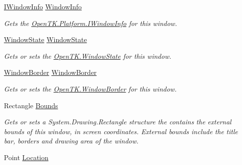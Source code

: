 \begin{DoxyCompactItemize}
\hyperlink{interface_open_t_k_1_1_platform_1_1_i_window_info}{I\-Window\-Info} \hyperlink{interface_open_t_k_1_1_i_native_window_a3e00033ca7bda60905c346fc2335e1b8}{Window\-Info}
\begin{DoxyCompactList}\small\item\em Gets the \hyperlink{interface_open_t_k_1_1_platform_1_1_i_window_info}{Open\-T\-K.\-Platform.\-I\-Window\-Info} for this window. \end{DoxyCompactList}\item 
\hyperlink{namespace_open_t_k_ace9268dc87bd36f48c9d9d8b939559b4}{Window\-State} \hyperlink{interface_open_t_k_1_1_i_native_window_a228db8bdb7282c03e98c103bc6ea9904}{Window\-State}
\begin{DoxyCompactList}\small\item\em Gets or sets the \hyperlink{namespace_open_t_k_ace9268dc87bd36f48c9d9d8b939559b4}{Open\-T\-K.\-Window\-State} for this window. \end{DoxyCompactList}\item 
\hyperlink{namespace_open_t_k_a20f46792b5471ff32362bd0a29fa5f1c}{Window\-Border} \hyperlink{interface_open_t_k_1_1_i_native_window_afb974cc1ffb686860725736bd07c2211}{Window\-Border}
\begin{DoxyCompactList}\small\item\em Gets or sets the \hyperlink{namespace_open_t_k_a20f46792b5471ff32362bd0a29fa5f1c}{Open\-T\-K.\-Window\-Border} for this window. \end{DoxyCompactList}\item 
Rectangle \hyperlink{interface_open_t_k_1_1_i_native_window_a0cf4d0391cff1166a3f15fbdb1b4d8ab}{Bounds}
\begin{DoxyCompactList}\small\item\em Gets or sets a System.\-Drawing.\-Rectangle structure the contains the external bounds of this window, in screen coordinates. External bounds include the title bar, borders and drawing area of the window. \end{DoxyCompactList}\item 
Point \hyperlink{interface_open_t_k_1_1_i_native_window_adb40bbbb862af25e3f05dd6bc20ae0c2}{Location}

\end{DoxyCompactItemize}
